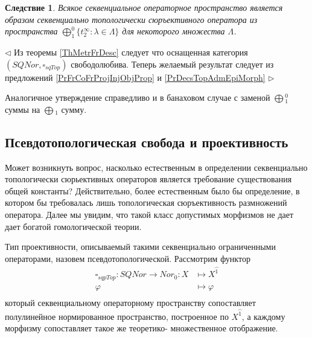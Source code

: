 \documentclass[12pt]{article}
\newtheorem{corollary}[theorem]{Следствие}
\newenvironment{proof}{\par $\triangleleft$}{$\triangleright$}
\begin{document}
\begin{corollary}\label{CorSQSpaceIsImgTopAdmEpiMorph}
Всякое секвенциальное операторное пространство является образом секвенциально топологически сюръективного оператора из пространства $\bigoplus_1^0\{t_2^\infty:\lambda\in\Lambda\}$ для некоторого множества $\Lambda$.
\end{corollary}
\begin{proof}
Из теоремы \ref{ThMetrFrDesc} следует что оснащенная категория $(SQNor,\square_{sqTop})$ свободолюбива. Теперь желаемый результат следует из предложений \ref{PrFrCoFrProjInjObjProp} и \ref{PrDecsTopAdmEpiMorph}
\end{proof}


Аналогичное утверждение справедливо и в банаховом случае с заменой $\bigoplus{}_1^0$ суммы на $\bigoplus{}_1$ сумму.







































\subsection{Псевдотопологическая свобода и проективность}

Может возникнуть вопрос, насколько естественным в определении секвенциально топологически сюрьективных операторов является требование существования общей константы? Действительно, более 
естественным было бы определение, в котором бы требовалась лишь топологическая сюръективность размножений оператора. Далее мы увидим, что такой класс допустимых морфизмов не дает дает богатой 
гомологической теории.

Тип проективности, описываемый такими секвенциально ограниченными операторами, назовем псевдотопологической. Рассмотрим функтор
$$
\begin{aligned}
\square_{sqpTop} : SQNor \to Nor_0: X &\mapsto X^{\wideparen{1}}\\
\varphi&\mapsto\varphi\\
\end{aligned}
$$
который секвенциальному операторному пространству сопоставляет полулинейное нормированное пространство, построенное по $X^{\wideparen{1}}$, а каждому морфизму сопоставляет такое же теоретико- множественное отображение.
\end{document}
